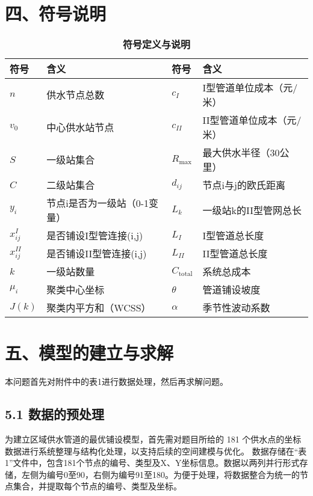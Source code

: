 \documentclass[12pt,a4paper]{article}
\begin{document}
\section*{\centering 四、符号说明}
\vspace{-0.5em}
\vspace{0.5em} %
\begin{table}[H]
\centering
\renewcommand{\arraystretch}{1.4} %
\setlength{\tabcolsep}{10pt}     %
\setlength{\abovecaptionskip}{3pt} %
\caption{\textbf{符号定义与说明}}
\begin{tabular}{>{\centering\arraybackslash}m{1.8cm} | >{\raggedright\arraybackslash}m{5.2cm} | >{\centering\arraybackslash}m{1.8cm} | >{\raggedright\arraybackslash}m{5.2cm}}
\hline
\textbf{符号} & \textbf{含义} & \textbf{符号} & \textbf{含义} \\
\hline
\( n \) & 供水节点总数 & \( c_I \) & I型管道单位成本（元/米） \\
\hline
\( v_0 \) & 中心供水站节点 & \( c_{II} \) & II型管道单位成本（元/米） \\
\hline
\( S \) & 一级站集合 & \( R_{\max} \) & 最大供水半径（30公里） \\
\hline
\( C \) & 二级站集合 & \( d_{ij} \) & 节点i与j的欧氏距离 \\
\hline
\( y_i \) & 节点i是否为一级站（0-1变量） & \( L_k \) & 一级站k的II型管网总长 \\
\hline
\( x_{ij}^I \) & 是否铺设I型管连接(i,j) & \( L_I \) & I型管道总长度 \\
\hline
\( x_{ij}^{II} \) & 是否铺设II型管连接(i,j) & \( L_{II} \) & II型管道总长度 \\
\hline
\( k \) & 一级站数量 & \( C_{\text{total}} \) & 系统总成本 \\
\hline
\( \mu_i \) & 聚类中心坐标 & \( \theta \) & 管道铺设坡度 \\
\hline
\( J(k) \) & 聚类内平方和（WCSS） & \( \alpha \) & 季节性波动系数 \\
\hline
\end{tabular}
\end{table}
\section*{\centering 五、模型的建立与求解}
本问题首先对附件中的表1进行数据处理，然后再求解问题。

\subsection*{5.1 数据的预处理}
为建立区域供水管道的最优铺设模型，首先需对题目所给的 181 个供水点的坐标数据进行系统整理与结构化处理，以支持后续的空间建模与优化。
数据存储在“表1”文件中，包含181个节点的编号、类型及X、Y坐标信息。数据以两列并行形式存储，左侧为编号0至90，右侧为编号91至180。为便于处理，将数据整合为统一的节点集合，并提取每个节点的编号、类型及坐标。
\end{document}
